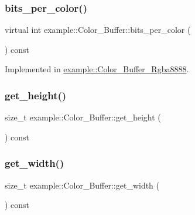 \subsubsection{\texorpdfstring{bits\+\_\+per\+\_\+color()}{bits\_per\_color()}}
{\footnotesize\ttfamily virtual int example\+::\+Color\+\_\+\+Buffer\+::bits\+\_\+per\+\_\+color (\begin{DoxyParamCaption}{ }\end{DoxyParamCaption}) const\hspace{0.3cm}{\ttfamily [pure virtual]}}



Implemented in \mbox{\hyperlink{classexample_1_1_color___buffer___rgba8888_ab2e7a20a9dd24c5dd422d143d9a2d391}{example\+::\+Color\+\_\+\+Buffer\+\_\+\+Rgba8888}}.

\mbox{\label{classexample_1_1_color___buffer_a4d1495a260205b83e1bd28dd04c6eda2}} 
\subsubsection{\texorpdfstring{get\+\_\+height()}{get\_height()}}
{\footnotesize\ttfamily size\+\_\+t example\+::\+Color\+\_\+\+Buffer\+::get\+\_\+height (\begin{DoxyParamCaption}{ }\end{DoxyParamCaption}) const\hspace{0.3cm}{\ttfamily [inline]}}

\mbox{\label{classexample_1_1_color___buffer_a0bbc4a120bc04b512e303baf8330ff82}} 
\subsubsection{\texorpdfstring{get\+\_\+width()}{get\_width()}}
{\footnotesize\ttfamily size\+\_\+t example\+::\+Color\+\_\+\+Buffer\+::get\+\_\+width (\begin{DoxyParamCaption}{ }\end{DoxyParamCaption}) const\hspace{0.3cm}{\ttfamily [inline]}}

